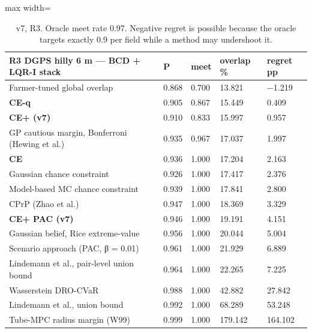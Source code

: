 \documentclass[preprint,12pt,authoryear]{elsarticle}
\begin{document}
\begin{table}[!htbp]
\centering
\footnotesize
\renewcommand{\thetable}{S3}\caption{v7, R3. Oracle meet rate 0.97. Negative regret is possible because the oracle targets exactly 0.9 per field while a method may undershoot it.}
\begin{adjustbox}{max width=\textwidth}
\begin{tabular}{@{}>{\raggedright\arraybackslash}p{20.8em}llll@{}}
\toprule
\textbf{R3 DGPS hilly 6 m --- BCD + LQR-I stack} & \textbf{P} & \textbf{meet} & \textbf{overlap \%} & \textbf{regret pp} \\
\midrule
Farmer-tuned global overlap & 0.868 & 0.700 & 13.821 & −1.219 \\
\textbf{CE-q} & 0.905 & 0.867 & 15.449 & 0.409 \\
\textbf{CE+ (v7)} & 0.910 & 0.833 & 15.997 & 0.957 \\
GP cautious margin, Bonferroni (Hewing et al.) & 0.935 & 0.967 & 17.037 & 1.997 \\
\textbf{CE} & 0.936 & 1.000 & 17.204 & 2.163 \\
Gaussian chance constraint & 0.926 & 1.000 & 17.417 & 2.376 \\
Model-based MC chance constraint & 0.939 & 1.000 & 17.841 & 2.800 \\
CPrP (Zhao et al.) & 0.947 & 1.000 & 18.369 & 3.329 \\
\textbf{CE+ PAC (v7)} & 0.946 & 1.000 & 19.191 & 4.151 \\
Gaussian belief, Rice extreme-value & 0.956 & 1.000 & 20.044 & 5.004 \\
Scenario approach (PAC, β = 0.01) & 0.961 & 1.000 & 21.929 & 6.889 \\
Lindemann et al., pair-level union bound & 0.964 & 1.000 & 22.265 & 7.225 \\
Wasserstein DRO-CVaR & 0.988 & 1.000 & 42.882 & 27.842 \\
Lindemann et al., union bound & 0.992 & 1.000 & 68.289 & 53.248 \\
Tube-MPC radius margin (W99) & 0.999 & 1.000 & 179.142 & 164.102 \\
\bottomrule
\end{tabular}
\end{adjustbox}
\end{table}
\end{document}
